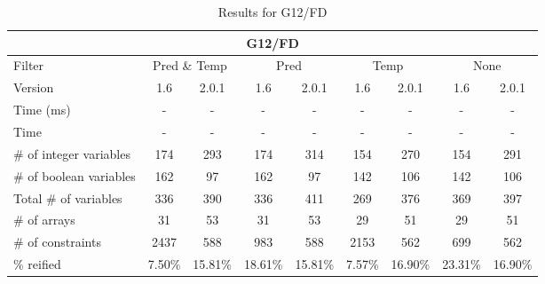 \documentclass{standalone}
\begin{document}
\begin{table}[H]
\footnotesize
\centering
\begin{tabular}{lc|c|c|c|c|c|c|c}
\multicolumn{9}{c}{G12/FD} \\ 
\hline\hline Filter & \multicolumn{2}{c|}{Pred \& Temp} &\multicolumn{2}{c|}{Pred}  & \multicolumn{2}{c|}{Temp} & \multicolumn{2}{c}{None} \\ 
\hline Version & 1.6 & 2.0.1 & 1.6 & 2.0.1 & 1.6 & 2.0.1 & 1.6 & 2.0.1 \\ 
Time (ms)               & - & - & - & - & - & - & - & - \\
Time                    & - & - & - & - & - & - & - & - \\ 
\# of integer variables & 174 & 293 & 174 & 314 & 154 & 270 & 154 & 291 \\ 
\# of boolean variables & 162 & 97 & 162 & 97 & 142 & 106 & 142 & 106 \\ 
Total \# of variables   & 336 & 390 & 336 & 411 & 269 & 376 & 369 & 397 \\ 
\# of arrays            & 31 & 53 & 31 & 53 & 29 & 51 & 29 & 51 \\ 
\# of constraints       & 2437 & 588 & 983 & 588 & 2153 & 562 & 699 & 562 \\ 
\% reified               & 7.50\% & 15.81\% & 18.61\% & 15.81\% & 7.57\% & 16.90\% &23.31\% & 16.90\% \\ 
\end{tabular}
\caption{Results for G12/FD}\label{tab:res_g12}
\end{table} 
\end{document}
